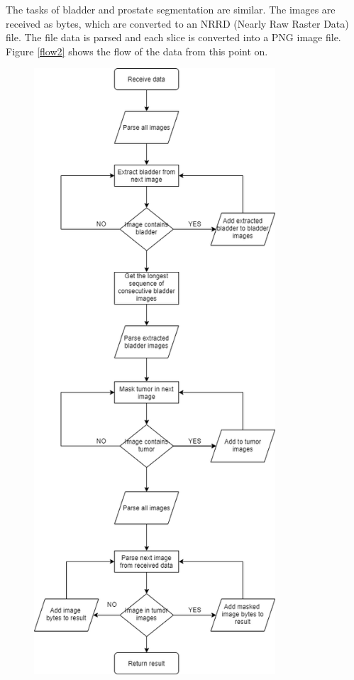 \documentclass[runningheads,a4paper,11pt]{report}
\begin{document}
The tasks of bladder and prostate segmentation are similar. The images are received as bytes, which are converted to an NRRD (Nearly Raw Raster Data) file. The file data is parsed and each slice is converted into a PNG image file. Figure \ref{flow2} shows the flow of the data from this point on.

\begin{minipage}{0.5\textwidth}
\begin{figure}[H]
\includegraphics[width=9cm,left]{images/flow_app.png}
\end{figure} \label{flow2}
\end{minipage} \hfill
\end{document}
